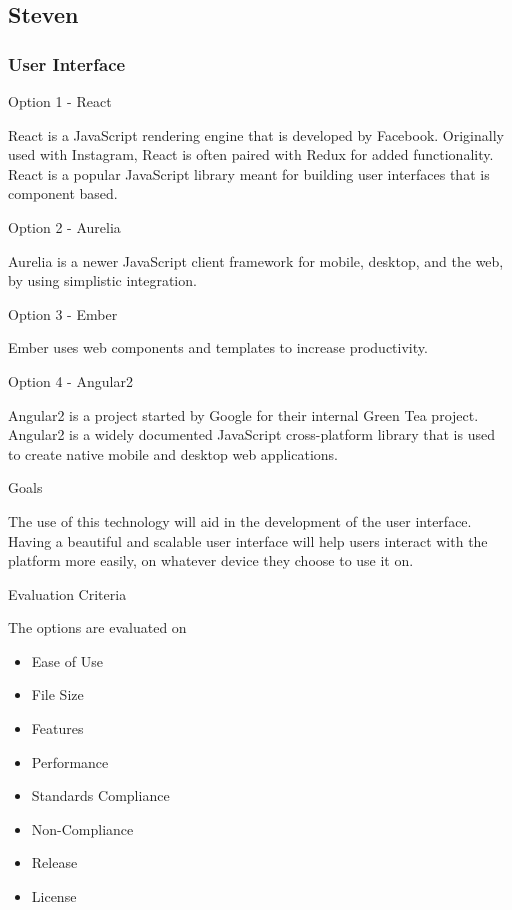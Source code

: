 \documentclass[letterpaper, 10pt, draftclsnofoot, compsoc, onecolumn]{IEEEtran}
\begin{document}
\subsection{Steven}
\vspace{1pc}

{\subsubsection{User Interface}
{\noindent Option 1 - React \par}
{\noindent React is a JavaScript rendering engine that is developed by Facebook. Originally used with Instagram, React is often paired with Redux for added functionality. React is a popular JavaScript library meant for building user interfaces that is component based. \par}

\medskip
{\noindent Option 2 - Aurelia \par}
{\noindent Aurelia is a newer JavaScript client framework for mobile, desktop, and the web, by using simplistic integration.  \par}

\medskip
{\noindent Option 3 - Ember \par}
{\noindent Ember uses web components and templates to increase productivity.  \par}

\medskip
{\noindent Option 4 - Angular2 \par}
{\noindent Angular2 is a project started by Google for their internal Green Tea project. Angular2 is a widely documented JavaScript cross-platform library that is used to create native mobile and desktop web applications. \par}

\medskip
{\noindent Goals \par}
{\noindent The use of this technology will aid in the development of the user interface. Having a beautiful and scalable user interface will help users interact with the platform more easily, on whatever device they choose to use it on. \par}

\medskip
\newpage
{\noindent Evaluation Criteria \par}
{\noindent The options are evaluated on 

\begin{itemize}
\item Ease of Use
\item File Size
\item Features
\item Performance
\item Standards Compliance
\item Non-Compliance
\item Release 
\item License
\end{itemize}

}}
\end{document}
